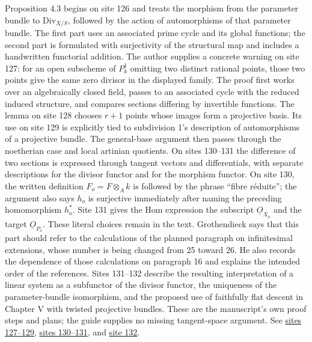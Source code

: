 Proposition 4.3 begins on site 126 and treats the morphism from the parameter bundle to \(\mathrm{Div}_{X/S}\), followed by the action of automorphisms of that parameter bundle. The first part uses an associated prime cycle and its global functions; the second part is formulated with surjectivity of the structural map and includes a handwritten functorial addition. The author supplies a concrete warning on site 127: for an open subscheme of \(P^1_k\) omitting two distinct rational points, those two points give the same zero divisor in the displayed family. The proof first works over an algebraically closed field, passes to an associated cycle with the reduced induced structure, and compares sections differing by invertible functions. The lemma on site 128 chooses \(r+1\) points whose images form a projective basis. Its use on site 129 is explicitly tied to subdivision 1's description of automorphisms of a projective bundle. The general-base argument then passes through the noetherian case and local artinian quotients. On sites 130--131 the difference of two sections is expressed through tangent vectors and differentials, with separate descriptions for the divisor functor and for the morphism functor. On site 130, the written definition \(F_o=F\otimes_A k\) is followed by the phrase ``fibre réduite''; the argument also says \(h_o\) is surjective immediately after naming the preceding homomorphism \(h_o^*\). Site 131 gives the Hom expression the subscript \(\underline O_{X_o}\) and the target \(\underline O_{P_o}\). These literal choices remain in the text. Grothendieck says that this part should refer to the calculations of the planned paragraph on infinitesimal extensions, whose number is being changed from 25 toward 26. He also records the dependence of those calculations on paragraph 16 and explains the intended order of the references. Sites 131--132 describe the resulting interpretation of a linear system as a subfunctor of the divisor functor, the uniqueness of the parameter-bundle isomorphism, and the proposed use of faithfully flat descent in Chapter V with twisted projective bundles. These are the manuscript's own proof steps and plans; the guide supplies no missing tangent-space argument. See \href{https://grothendieck.umontpellier.fr/web/viewer.html?file=../25.pdf#page=128}{sites 127--129}, \href{https://grothendieck.umontpellier.fr/web/viewer.html?file=../25.pdf#page=131}{sites 130--131}, and \href{https://grothendieck.umontpellier.fr/web/viewer.html?file=../25.pdf#page=133}{site 132}.

